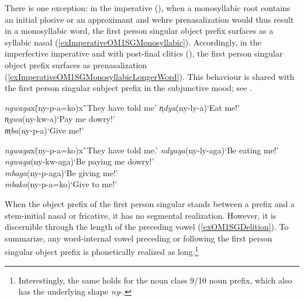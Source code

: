 There is one exception: in the imperative (), when a monosyllabic root contains an initial plosive or an approximant and wehre prenasalization would thus result in a monosyllabic word, the first person singular object prefix surfaces as a syllabic nasal (\ref{exImperativeOM1SGMonosyllabic}). Accordingly, in the imperfective imperative and with post-final clitics (), the first person singular object prefix surfaces as prenasalization (\ref{exImperativeOM1SGMonosyllabicLongerWord}). This behaviour is shared with the first person singular subject prefix in the subjunctive mood; see .

\begin{exe}
	\ex\label{exImperativeOM1SGMonosyllabic}
	\begin{tabbing}
		\textit{ngwaga}x\=(\degree ny-p-a=ko)x\=`They have told me'\kill
		\textit{n̩dya}\>(\degree ny-ly-a)\>`Eat me!'\\
		\textit{n̩gwa}\>(\degree ny-kw-a)\>`Pay me dowry!'\\
		\textit{m̩ba}\>(\degree ny-p-a)\>`Give me!'
	\end{tabbing}
	\ex\label{exImperativeOM1SGMonosyllabicLongerWord}
	\begin{tabbing}
		\textit{ngwaga}x\=(\degree ny-p-a=ko)x\=`They have told me.'\kill
		\textit{ndyaga}\>(\degree ny-ly-aga)\>`Be eating me!'\\
		\textit{ngwaga}\>(\degree ny-kw-aga)\>`Be paying me dowry!'\\
		\textit{mbaga}\>(\degree ny-p-aga)\>`Be giving me!'\\
		\textit{mbako}\>(\degree ny-p-a=ko)\>`Give to me!'
	\end{tabbing}
\end{exe} 

\label{NasalDelition} When the object prefix of the first person singular stands between a prefix and a stem-initial nasal or fricative, it has no segmental realization. However, it is discernible through the length of the preceding vowel (\ref{exOM1SGDelition}). To summarize, any word-internal vowel preceding or following the first person singular object prefix is phonetically realized as long.\footnote{Interestingly, the same holds for the noun class 9/10 noun prefix, which also has the underlying shape \textit{ny}-.}


